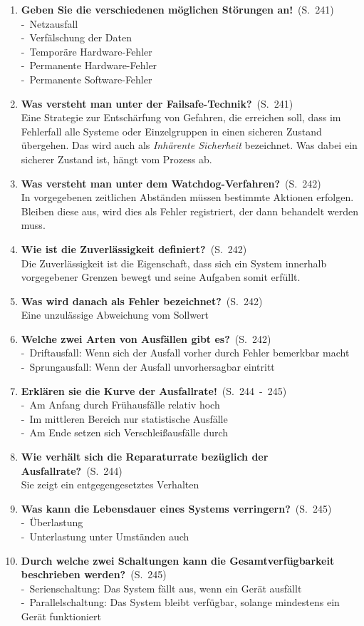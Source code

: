 \documentclass[a4paper,12pt]{article}
\newcommand{\question}[3]{\pagebreak[3]\item {\textbf{#1?}}\ (S.\ #2)#3}
\newcommand{\statement}[3]{\pagebreak[3]\item {\textbf{#1!}}\ (S.\ #2)#3}
\newcommand{\catchword}[1]{\\-\ #1}
\newcommand{\normaltext}[1]{\\#1}
\newcommand{\page}[1]{#1}
\newcommand{\pages}[2]{#1\ -\ #2}
\newcommand{\important}[1]{\index{#1}\textit{#1}}
\begin{document}
\begin{enumerate}
  \statement{Geben Sie die verschiedenen möglichen Störungen an}{\page{241}}
  {
    \catchword{Netzausfall}
    \catchword{Verfälschung der Daten}
    \catchword{Temporäre Hardware-Fehler}
    \catchword{Permanente Hardware-Fehler}
    \catchword{Permanente Software-Fehler}
  }

  \question{Was versteht man unter der Failsafe-Technik}{\page{241}}
  {
    \normaltext{Eine Strategie zur Entschärfung von Gefahren, die erreichen soll,
                dass im Fehlerfall alle Systeme oder Einzelgruppen in einen sicheren
                Zustand übergehen. Das wird auch als \important{Inhärente Sicherheit}
                bezeichnet. Was dabei ein sicherer Zustand ist, hängt vom Prozess ab.}
  }

  \question{Was versteht man unter dem Watchdog-Verfahren}{\page{242}}
  {
    \normaltext{In vorgegebenen zeitlichen Abständen müssen bestimmte Aktionen erfolgen.
                Bleiben diese aus, wird dies als Fehler registriert, der dann behandelt
                werden muss.}
  }

  \question{Wie ist die Zuverlässigkeit definiert}{\page{242}}
  {
    \normaltext{Die Zuverlässigkeit ist die Eigenschaft, dass sich ein System innerhalb
                vorgegebener Grenzen bewegt und seine Aufgaben somit erfüllt.}
  }

  \question{Was wird danach als Fehler bezeichnet}{\page{242}}
  {
    \normaltext{Eine unzulässige Abweichung vom Sollwert}
  }

  \question{Welche zwei Arten von Ausfällen gibt es}{\page{242}}
  {
    \catchword{Driftausfall: Wenn sich der Ausfall vorher durch Fehler bemerkbar macht}
    \catchword{Sprungausfall: Wenn der Ausfall unvorhersagbar eintritt}
  }

  \statement{Erklären sie die Kurve der Ausfallrate}{\pages{244}{245}}
  {
    \catchword{Am Anfang durch Frühausfälle relativ hoch}
    \catchword{Im mittleren Bereich nur statistische Ausfälle}
    \catchword{Am Ende setzen sich Verschleißausfälle durch}
  }

  \question{Wie verhält sich die Reparaturrate bezüglich der Ausfallrate}{\page{244}}
  {
    \normaltext{Sie zeigt ein entgegengesetztes Verhalten}
  }

  \question{Was kann die Lebensdauer eines Systems verringern}{\page{245}}
  {
    \catchword{Überlastung}
    \catchword{Unterlastung unter Umständen auch}
  }

  \question{Durch welche zwei Schaltungen kann die Gesamtverfügbarkeit beschrieben
            werden}{\page{245}}
  {
    \catchword{Serienschaltung: Das System fällt aus, wenn ein Gerät ausfällt}
    \catchword{Parallelschaltung: Das System bleibt verfügbar, solange mindestens ein
               Gerät funktioniert}
  }


\end{enumerate}
\end{document}
